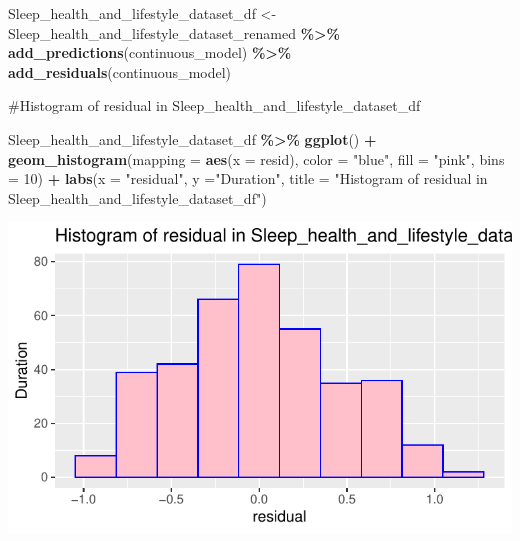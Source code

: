 \documentclass[
  11pt,
]{article}
\newenvironment{Shaded}{\begin{snugshade}}{\end{snugshade}}
\newcommand{\AttributeTok}[1]{\textcolor[rgb]{0.13,0.29,0.53}{#1}}
\newcommand{\DecValTok}[1]{\textcolor[rgb]{0.00,0.00,0.81}{#1}}
\newcommand{\FunctionTok}[1]{\textcolor[rgb]{0.13,0.29,0.53}{\textbf{#1}}}
\newcommand{\NormalTok}[1]{#1}
\newcommand{\OtherTok}[1]{\textcolor[rgb]{0.56,0.35,0.01}{#1}}
\newcommand{\SpecialCharTok}[1]{\textcolor[rgb]{0.81,0.36,0.00}{\textbf{#1}}}
\newcommand{\StringTok}[1]{\textcolor[rgb]{0.31,0.60,0.02}{#1}}
\begin{document}
\begin{Shaded}
\end{Shaded}

\begin{Shaded}
\begin{Highlighting}[]
\NormalTok{Sleep\_health\_and\_lifestyle\_dataset\_df }\OtherTok{\textless{}{-}}\NormalTok{ Sleep\_health\_and\_lifestyle\_dataset\_renamed }\SpecialCharTok{\%\textgreater{}\%}
  \FunctionTok{add\_predictions}\NormalTok{(continuous\_model) }\SpecialCharTok{\%\textgreater{}\%}
  \FunctionTok{add\_residuals}\NormalTok{(continuous\_model)}
\end{Highlighting}
\end{Shaded}

\#Histogram of residual in Sleep\_health\_and\_lifestyle\_dataset\_df

\begin{Shaded}
\begin{Highlighting}[]
\NormalTok{Sleep\_health\_and\_lifestyle\_dataset\_df }\SpecialCharTok{\%\textgreater{}\%}
  \FunctionTok{ggplot}\NormalTok{() }\SpecialCharTok{+}
  \FunctionTok{geom\_histogram}\NormalTok{(}\AttributeTok{mapping =} \FunctionTok{aes}\NormalTok{(}\AttributeTok{x =}\NormalTok{ resid), }\AttributeTok{color =} \StringTok{"blue"}\NormalTok{, }\AttributeTok{fill =} \StringTok{"pink"}\NormalTok{, }\AttributeTok{bins =} \DecValTok{10}\NormalTok{) }\SpecialCharTok{+}
  \FunctionTok{labs}\NormalTok{(}\AttributeTok{x =} \StringTok{"residual"}\NormalTok{, }\AttributeTok{y =}\StringTok{"Duration"}\NormalTok{,}
\AttributeTok{title =} \StringTok{"Histogram of residual in Sleep\_health\_and\_lifestyle\_dataset\_df"}\NormalTok{)}
\end{Highlighting}
\end{Shaded}

\begin{center}\includegraphics[width=0.7\linewidth]{SleepHelath_files/figure-latex/unnamed-chunk-58-1} \end{center}
\end{document}
